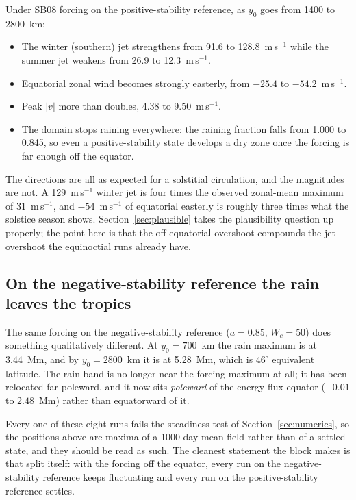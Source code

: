 \documentclass[11pt]{article}
\newcommand{\ms}{m\,s$^{-1}$}
\begin{document}
Under SB08 forcing on the positive-stability reference, as $y_0$ goes from 1400
to 2800~km:

\begin{itemize}
\item The winter (southern) jet strengthens from 91.6 to 128.8~\ms{} while the
summer jet weakens from 26.9 to 12.3~\ms.
\item Equatorial zonal wind becomes strongly easterly, from $-25.4$ to
$-54.2$~\ms.
\item Peak $|v|$ more than doubles, 4.38 to 9.50~\ms.
\item The domain stops raining everywhere: the raining fraction falls from
1.000 to 0.845, so even a positive-stability state develops a dry zone once the
forcing is far enough off the equator.
\end{itemize}

The directions are all as expected for a solstitial circulation, and the
magnitudes are not. A 129~\ms{} winter jet is four times the observed
zonal-mean maximum of 31~\ms, and $-54$~\ms{} of equatorial easterly is roughly
three times what the solstice season shows. Section~\ref{sec:plausible} takes
the plausibility question up properly; the point here is that the off-equatorial
overshoot compounds the jet overshoot the equinoctial runs already have.

\subsection{On the negative-stability reference the rain leaves the tropics}

The same forcing on the negative-stability reference ($a = 0.85$, $W_c = 50$)
does something qualitatively different. At $y_0 = 700$~km the rain maximum is
at 3.44~Mm, and by $y_0 = 2800$~km it is at 5.28~Mm, which is $46^\circ$
equivalent latitude. The rain band is no longer near the forcing maximum at all;
it has been relocated far poleward, and it now sits \emph{poleward} of the
energy flux equator ($-0.01$ to $2.48$~Mm) rather than equatorward of it.

Every one of these eight runs fails the steadiness test of
Section~\ref{sec:numerics}, so the positions above are maxima of a 1000-day mean
field rather than of a settled state, and they should be read as such. The
cleanest statement the block makes is that split itself: with the forcing off
the equator, every run on the negative-stability reference keeps fluctuating and
every run on the positive-stability reference settles.
\end{document}

